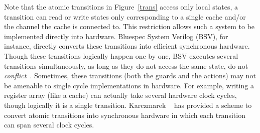 Note that the atomic transitions in Figure~\ref{trans} access only local states,
\ie{} a transition can read or write states only corresponding to a single cache
and/or the channel the cache is connected to. This restriction allows such a
system to be implemented directly into hardware. Bluespec System Verilog (BSV),
for instance, directly converts these transitions into efficient synchronous
hardware. Though these transitions logically happen one by one, BSV executes
several transitions simultaneously, as long as they do not access the same
state, \ie{} do not \emph{conflict}~\cite{Hoe:TCAD,HoeArvind:TRSSynthesis1}.
Sometimes, these transitions (both the guards and the actions) may not be
amenable to single cycle implementations in hardware. For example, writing a
register array (like a cache) can actually take several hardware clock cycles,
though logically it is a single transition.  Karczmarek \etal~\cite{Karczmarek}
has provided a scheme to convert atomic transitions into synchronous hardware
in which each transition can span several clock cycles.
